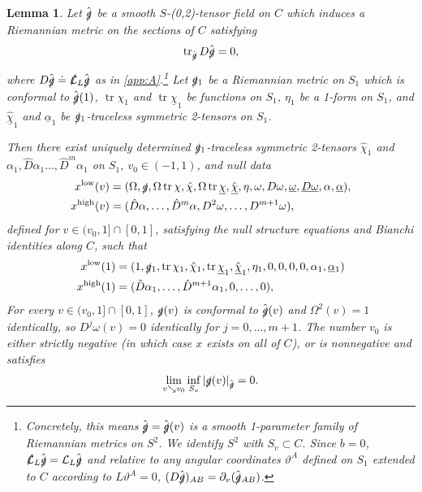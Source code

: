 \documentclass[10pt]{article}
\numberwithin{equation}{section}
\theoremstyle{plain}
\newtheorem{lem}{Lemma}[section]
\theoremstyle{definition}
\newcommand{\tr}{\operatorname{tr}}
\begin{document}
\begin{lem}\label{lem:seed-data} Let $\hat{\slashed g}$ be a smooth $S$-(0,2)-tensor field on $C$ which induces a Riemannian metric on the sections of $C$ satisfying 
\begin{equation}
    \tr_{\hat{\slashed g}}D\hat{\slashed g}=0,\label{eq:traceless}
\end{equation}
where $D\hat{\slashed g}\doteq \slashed{\mathcal L}{}_L\hat{\slashed g}$ as in \cref{app:A}.\footnote{Concretely, this means $\hat{\slashed g}=\hat{\slashed g}(v)$ is a smooth 1-parameter family of Riemannian metrics on $S^2$. We identify $S^2$ with $S_v\subset C$. Since $b=0$, $\slashed {\mathcal L}{}_L\hat{\slashed g}=\mathcal L_L\hat{\slashed g}$ and relative to any angular coordinates $\vartheta^A$ defined on $S_1$ extended to $C$ according to $L\vartheta^A=0$, $(D\hat{\slashed g})_{AB}=\partial_v(\hat{\slashed g}{}_{AB})$.}
Let $\slashed g{}_1$ be a Riemannian metric on $S_1$ which is conformal to $\hat{\slashed g}(1)$, $\tr\chi_1$ and $\tr\underline\chi_1$ be functions on $S_1$, $\eta_1$ be a 1-form on $S_1$, and $\hat{\underline\chi}_1$ and $\underline\alpha_1$ be ${\slashed g}{}_1$-traceless symmetric 2-tensors on $S_1$.  

Then there exist uniquely determined ${\slashed g}{}_1$-traceless symmetric 2-tensors $\hat\chi_1$ and $\alpha_1,\hat{D}\alpha_1\dotsc,\hat{D}^m\alpha_1$ on $S_1$, $v_0\in (-1,1)$, and null data 
\begin{align*}
   x^\mathrm{low}(v) &=(\Omega, \slashed g, \Omega \tr\chi , \hat \chi, \Omega \tr \underline\chi, \hat{\underline \chi}, \eta, \omega, D \omega,\underline \omega, \underline{D \omega} , \alpha, \underline \alpha),\\
   x^\mathrm{high}(v)&=(\hat D\alpha,\dotsc, \hat D^m\alpha,D^2\omega,\dotsc,D^{m+1}\omega),
\end{align*}
defined for $v\in (v_0,1]\cap [0,1]$, satisfying the null structure equations and Bianchi identities along $C$, such that 
\begin{align}
      \label{eq:x(1)}  x^\mathrm{low}(1)&= (1,\slashed g{}_1,\tr\chi_1,\hat\chi_1,\tr\underline\chi_1,\hat{\underline\chi}_1,\eta_1,0,0,0,0,\alpha_1,\underline\alpha{}_1)\\
        x^{\mathrm{high}}(1)&=(\hat D\alpha_1,\dotsc,\hat D^{m+1}\alpha_1,0,\dotsc,0), 
\end{align}
For every $v\in (v_0,1]\cap [0,1]$, $\slashed g(v)$ is conformal to $\hat{\slashed g}(v)$ and $\Omega^2(v)=1$ identically, so $D^j\omega(v)=0$ identically for $j=0,\dotsc,m+1$. The number $v_0$ is either strictly negative (in which case $x$ exists on all of $C$), or is nonnegative and satisfies 
\begin{equation}
    \lim_{v\searrow v_0}\inf_{S_v}|\slashed g(v)|_{\hat{\slashed g}}=0.\label{eq:continuation}
\end{equation}
\end{lem}
\end{document}
